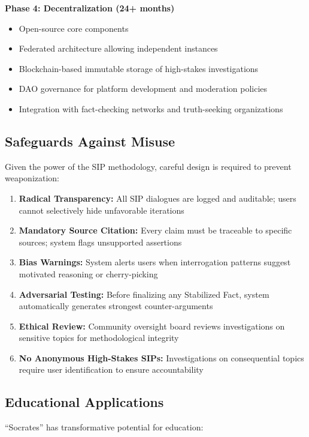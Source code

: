 \documentclass[11pt,a4paper]{article}
\begin{document}
\textbf{Phase 4: Decentralization (24+ months)}
\begin{itemize}[nosep]
    \item Open-source core components
    \item Federated architecture allowing independent instances
    \item Blockchain-based immutable storage of high-stakes investigations
    \item DAO governance for platform development and moderation policies
    \item Integration with fact-checking networks and truth-seeking organizations
\end{itemize}

\subsection{Safeguards Against Misuse}

Given the power of the SIP methodology, careful design is required to prevent weaponization:

\begin{enumerate}[leftmargin=*]
    \item \textbf{Radical Transparency:} All SIP dialogues are logged and auditable; users cannot selectively hide unfavorable iterations
    \item \textbf{Mandatory Source Citation:} Every claim must be traceable to specific sources; system flags unsupported assertions
    \item \textbf{Bias Warnings:} System alerts users when interrogation patterns suggest motivated reasoning or cherry-picking
    \item \textbf{Adversarial Testing:} Before finalizing any Stabilized Fact, system automatically generates strongest counter-arguments
    \item \textbf{Ethical Review:} Community oversight board reviews investigations on sensitive topics for methodological integrity
    \item \textbf{No Anonymous High-Stakes SIPs:} Investigations on consequential topics require user identification to ensure accountability
\end{enumerate}

\subsection{Educational Applications}

``Socrates'' has transformative potential for education:
\end{document}
